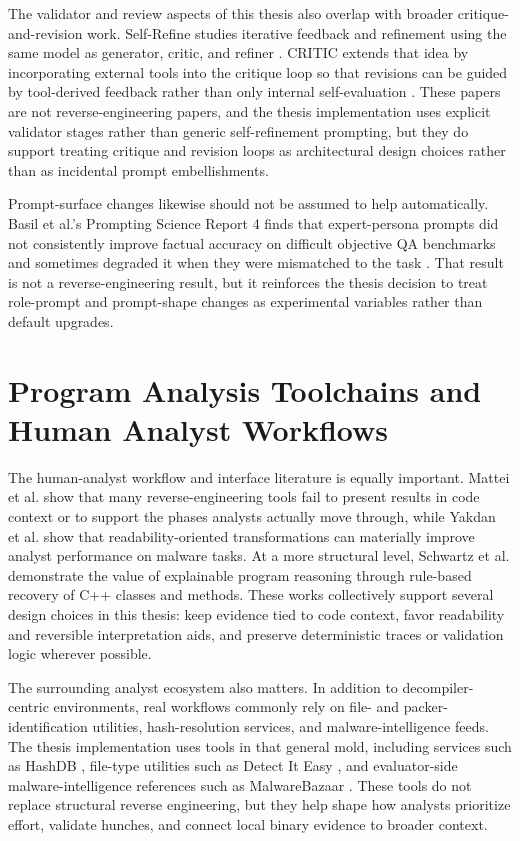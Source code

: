 The validator and review aspects of this thesis also overlap with broader critique-and-revision work. Self-Refine studies iterative feedback and refinement using the same model as generator, critic, and refiner \cite{madaan2023selfrefineiterativerefinementselffeedback}. CRITIC extends that idea by incorporating external tools into the critique loop so that revisions can be guided by tool-derived feedback rather than only internal self-evaluation \cite{gou2024criticlargelanguagemodels}. These papers are not reverse-engineering papers, and the thesis implementation uses explicit validator stages rather than generic self-refinement prompting, but they do support treating critique and revision loops as architectural design choices rather than as incidental prompt embellishments.

Prompt-surface changes likewise should not be assumed to help automatically. Basil et al.'s Prompting Science Report 4 finds that expert-persona prompts did not consistently improve factual accuracy on difficult objective QA benchmarks and sometimes degraded it when they were mismatched to the task \cite{basil2025promptingscience4}. That result is not a reverse-engineering result, but it reinforces the thesis decision to treat role-prompt and prompt-shape changes as experimental variables rather than default upgrades.

\section{Program Analysis Toolchains and Human Analyst Workflows}

The human-analyst workflow and interface literature is equally important. Mattei et al. \cite{mattei2022reusability} show that many reverse-engineering tools fail to present results in code context or to support the phases analysts actually move through, while Yakdan et al. \cite{yakdan2016johnny} show that readability-oriented transformations can materially improve analyst performance on malware tasks. At a more structural level, Schwartz et al. \cite{schwartz2018logic} demonstrate the value of explainable program reasoning through rule-based recovery of C++ classes and methods. These works collectively support several design choices in this thesis: keep evidence tied to code context, favor readability and reversible interpretation aids, and preserve deterministic traces or validation logic wherever possible.

The surrounding analyst ecosystem also matters. In addition to decompiler-centric environments, real workflows commonly rely on file- and packer-identification utilities, hash-resolution services, and malware-intelligence feeds. The thesis implementation uses tools in that general mold, including services such as HashDB \cite{hashdb2025}, file-type utilities such as Detect It Easy \cite{detectiteasy2025}, and evaluator-side malware-intelligence references such as MalwareBazaar \cite{malwarebazaar2025}. These tools do not replace structural reverse engineering, but they help shape how analysts prioritize effort, validate hunches, and connect local binary evidence to broader context.

